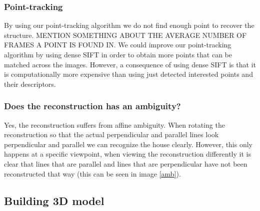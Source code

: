 \documentclass[12pt]{amsart}
\begin{document}
\subsubsection{Point-tracking}
By using our point-tracking algorithm we do not find enough point to recover the structure. MENTION SOMETHING ABOUT THE AVERAGE NUMBER OF FRAMES A POINT IS FOUND IN. We could improve our point-tracking algorithm by using dense SIFT in order to obtain more points that can be matched across the images. However, a consequence of using dense SIFT is that it is computationally more expensive than using just detected interested points and their descriptors.

\subsubsection{Does the reconstruction has an ambiguity?} 
Yes, the reconstruction suffers from affine ambiguity. When rotating the reconstruction so that the actual perpendicular and parallel lines look perpendicular and parallel we can recognize the house clearly. However, this only happens at a specific viewpoint, when viewing the reconstruction differently it is clear that lines that are parallel and lines that are perpendicular have not been reconstructed that way (this can be seen in image \ref{amb}). \subsection{Building 3D model}
\end{document}
